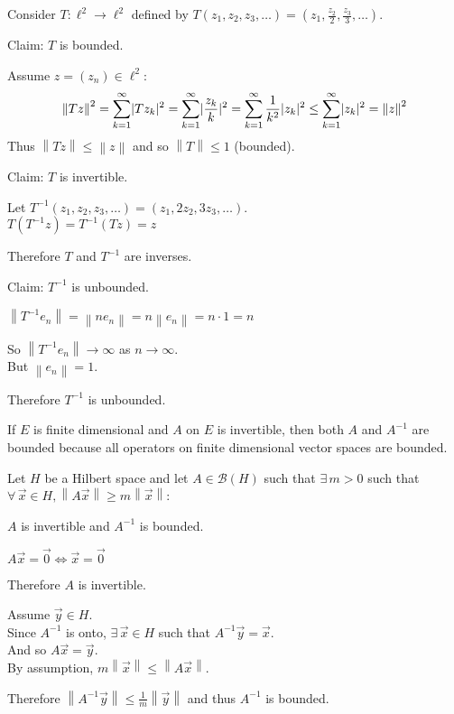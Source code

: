 \documentclass[letterpaper,12pt,fleqn]{article}
\newcommand{\mb}{\mathcal{B}}
\newcommand{\vx}{\vec{x}}
\newcommand{\vy}{\vec{y}}
\newcommand{\vo}{\vec{0}}
\newcommand{\norm}[1]{\left\|#1\right\|}
\begin{document}
\begin{example}
  Consider $T:\ell^2\to\ell^2$ defined by
  $T(z_1,z_2,z_3,\ldots)=\left(z_1,\frac{z_2}{2},\frac{z_3}{3},\ldots\right)$.

  Claim: $T$ is bounded.

  Assume $z=(z_n)\in\ell^2$:
  \[\norm{Tz}^2=\sum_{k=1}^{\infty}\abs{Tz_k}^2=
  \sum_{k=1}^{\infty}\abs{\frac{z_k}{k}}^2=
  \sum_{k=1}^{\infty}\frac{1}{k^2}\abs{z_k}^2\le
  \sum_{k=1}^{\infty}\abs{z_k}^2=\norm{z}^2\]
  Thus $\norm{Tz}\le\norm{z}$ and so $\norm{T}\le1$ (bounded).

  Claim: $T$ is invertible.

  Let $T^{-1}(z_1,z_2,z_3,\ldots)=(z_1,2z_2,3z_3,\ldots)$. \\
  $T(T^{-1}z)=T^{-1}(Tz)=z$

  Therefore $T$ and $T^{-1}$ are inverses.

  Claim: $T^{-1}$ is unbounded.

  $\norm{T^{-1}e_n}=\norm{ne_n}=n\norm{e_n}=n\cdot1=n$

  So $\norm{T^{-1}e_n}\to\infty$ as $n\to\infty$. \\
  But $\norm{e_n}=1$.

  Therefore $T^{-1}$ is unbounded.
\end{example}

If $E$ is finite dimensional and $A$ on $E$ is invertible, then both $A$ and
$A^{-1}$ are bounded because all operators on finite dimensional vector spaces
are bounded.

\begin{theorem}
  Let $H$ be a Hilbert space and let $A\in\mb(H)$ such that $\exists\,m>0$
  such that $\forall\,\vx\in H, \norm{A\vx}\ge m\norm{\vx}$:

  \qquad$A$ is invertible and $A^{-1}$ is bounded.
\end{theorem}

\begin{theproof}
  $A\vx=\vo\iff\vx=\vo$

  Therefore $A$ is invertible.

  Assume $\vy\in H$. \\
  Since $A^{-1}$ is onto, $\exists\,\vx\in H$ such that $A^{-1}\vy=\vx$. \\
  And so $A\vx=\vy$. \\
  By assumption, $m\norm{\vx}\le\norm{A\vx}$.

  Therefore $\norm{A^{-1}\vy}\le\frac{1}{m}\norm{\vy}$ and thus $A^{-1}$ is
  bounded.
\end{theproof}
\end{document}
